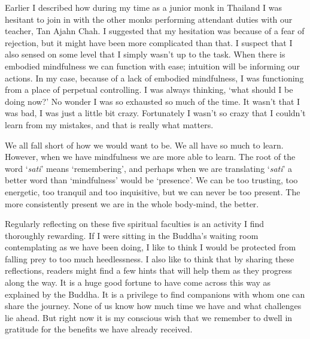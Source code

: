 Earlier I described how during my time as a junior monk in Thailand I
was hesitant to join in with the other monks performing attendant duties
with our teacher, Tan Ajahn Chah. I suggested that my hesitation was
because of a fear of rejection, but it might have been more complicated
than that. I suspect that I also sensed on some level that I simply
wasn't up to the task. When there is embodied mindfulness we can
function with ease; intuition will be informing our actions. In my case,
because of a lack of embodied mindfulness, I was functioning from a
place of perpetual controlling. I was always thinking, `what should I be
doing now?' No wonder I was so exhausted so much of the time. It wasn't
that I was bad, I was just a little bit crazy. Fortunately I wasn't so crazy
that I couldn't learn from my mistakes, and that is really what matters.

We all fall short of how we would want to be. We all have so much to
learn. However, when we have mindfulness we are more able to learn. The
root of the word `\emph{sati}' means `remembering', and perhaps when we
are translating `\emph{sati}' a better word than `mindfulness' would be
`presence'. We can be too trusting, too energetic, too tranquil and too
inquisitive, but we can never be too present. The more consistently
present we are in the whole body-mind, the better.

\sectionBreak

Regularly reflecting on these five spiritual faculties is an activity I
find thoroughly rewarding. If I were sitting in the Buddha's waiting
room contemplating as we have been doing, I like to think I would be
protected from falling prey to too much heedlessness. I also like to
think that by sharing these reflections, readers might find a few hints
that will help them as they progress along the way. It is a huge good
fortune to have come across this way as explained by the Buddha. It is a
privilege to find companions with whom one can share the journey. None
of us know how much time we have and what challenges lie ahead. But
right now it is my conscious wish that we remember to dwell in gratitude
for the benefits we have already received.

